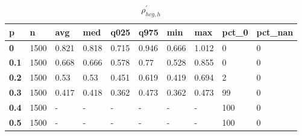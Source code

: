 \begin{table}[h]
 \centering 
\footnotesize
\caption{$\rho_{hcg,h}^\prime $}
\label{tab:alphahcgh}
\begin{tabular}[h]{|l|l|l|l|l|l|l|l|l|l|
    } \hline
\textbf{ p} & \textbf{ n} & \textbf{ avg} & \textbf{ med} & \textbf{ q025} & \textbf{ q975} & \textbf{ min} & \textbf{ max} & \textbf{ pct\_0} & \textbf{ pct\_nan}
    \\ \hline
  \textbf{  0} & 1500 & 0.821 & 0.818 & 0.715 & 0.946 & 0.666 & 1.012 &   0 & 0
    \\ \hline
  \textbf{0.1} & 1500 & 0.668 & 0.666 & 0.578 &  0.77 & 0.528 & 0.855 &   0 & 0
    \\ \hline
  \textbf{0.2} & 1500 &  0.53 &  0.53 & 0.451 & 0.619 & 0.419 & 0.694 &   2 & 0
    \\ \hline
  \textbf{0.3} & 1500 & 0.417 & 0.418 & 0.362 & 0.473 & 0.362 & 0.473 &  99 & 0
    \\ \hline
  \textbf{0.4} & 1500 & - & - & - & - & - & - & 100 & 0
    \\ \hline
  \textbf{0.5} & 1500 & - & - & - & - & - & - & 100 & 0
    \\ \hline
 \end{tabular}
 \end{table}
